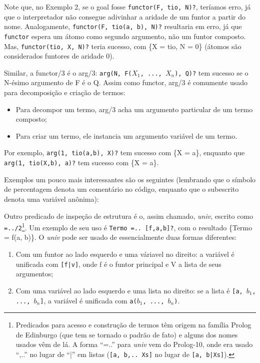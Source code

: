 \documentclass{article}
\theoremstyle{remark}
\theoremstyle{theorem}
\begin{document}
Note que, no Exemplo 2, se o goal fosse {\tt functor(F, tio, N)?}, teríamos erro, já que o interpretador não consegue adivinhar a aridade de um funtor a partir do nome. Analogamente, %
{\tt functor(F, tio(a, b), N)?} resultaria em erro, já que {\tt functor} espera um átomo como segundo argumento, não um funtor composto. Mas, {\tt functor(tio, X, N)?} teria sucesso, com \{X = tio, N = 0\} (átomos são considerados funtores de aridade 0).

Similar, a functor/3 é o arg/3: {\tt arg(N, F($X_1$, ..., $X_n$), Q)?} tem sucesso se o N-ésimo argumento de F é o Q. Assim como functor, arg/3 é comumente usado para decomposição e criação de termos:
\begin{itemize}
  \item Para decompor um termo, arg/3 acha um argumento particular de um termo composto;
  \item Para criar um termo, ele instancia um argumento variável de um termo.
\end{itemize}

Por exemplo, {\tt arg(1, tio(a,b), X)?} tem sucesso com \{X = a\}, enquanto que {\tt arg(1, tio(X,b), a)?} tem sucesso com \{X = a\}.

Exemplos um pouco mais interessantes são os seguintes (lembrando que o símbolo de percentagem denota um comentário no código, enquanto que o subescrito denota uma variável anônima):





Outro predicado de inspeção de estrutura é o, assim chamado, \textit{univ}, escrito como {\tt =../2}\footnote{Predicados para acesso e construção de termos têm origem na família Prolog de Edinburgo (que tem se tornado o padrão de fato) e alguns dos nomes usados vêm de lá. A forma “=..” para \textit{univ} vem do Prolog-10, onde era usado “,..” no lugar de “|” em listas ({\tt[a, b,.. Xs]} no lugar de {\tt [a, b|Xs]}).}. Um exemplo de seu uso é {\tt Termo =.. [f,a,b]?}, com o resultado \{Termo = f(a, b)\}.
O \textit{univ} pode ser usado de essencialmente duas formas diferentes:
\begin{enumerate}
  \item Com um funtor ao lado esquerdo e uma váriavel no direito: a variável é unificada com {\tt [f|v]}, onde f é o funtor principal e V a lista de seus argumentos;
  \item Com uma variável ao lado esquerdo e uma lista no direito: se a lista é {\tt [a, $b_1$, ..., $b_n$]}, a variável é unificada com {\tt a($b_1$, ..., $b_n$)}.
\end{enumerate}
\end{document}
